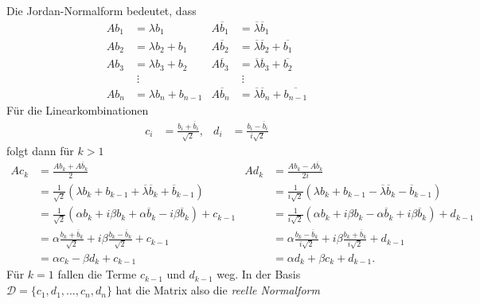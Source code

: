 Die Jordan-Normalform bedeutet, dass
\[
\begin{aligned}
Ab_1&=\lambda b_1           &
	A\overline{b}_1 &= \overline{\lambda} \overline{b}_1      \\
Ab_2&=\lambda b_2 + b_1     &
	A\overline{b}_2 &= \overline{\lambda} \overline{b}_2 +\overline{b_1}\\
Ab_3&=\lambda b_3 + b_2     &
	A\overline{b}_3 &= \overline{\lambda} \overline{b}_3 +\overline{b_2}\\
    &\;\vdots               &
	                 &\;\vdots \\
Ab_n&=\lambda b_n + b_{n-1} &
	A\overline{b}_n &= \overline{\lambda} \overline{b}_n +\overline{b_{n-1}}
\end{aligned}
\]
Für die Linearkombinationen
\begin{equation}
\begin{aligned}
c_i &= \frac{b_i+\overline{b}_i}{\sqrt{2}},
&
d_i &= \frac{b_i-\overline{b}_i}{i\sqrt{2}}
\end{aligned}
\label{buch:eigenwerte:eqn:reellenormalformumrechnung}
\end{equation}
folgt dann für $k>1$
\begin{align*}
Ac_k
&=
\frac{Ab_k+A\overline{b}_k}{2}
&
Ad_k
&=
\frac{Ab_k-A\overline{b}_k}{2i}
\\
&=
\frac1{\sqrt{2}}(\lambda b_k + b_{k-1}
+ \overline{\lambda}\overline{b}_k + \overline{b}_{k-1})
&
&=
\frac1{i\sqrt{2}}(\lambda b_k + b_{k-1}
- \overline{\lambda}\overline{b}_k - \overline{b}_{k-1})
\\
&=
\frac1{\sqrt{2}}(\alpha b_k + i\beta b_k + \alpha \overline{b}_k -i\beta \overline{b}_k)
+
c_{k-1}
&
&=
\frac1{i\sqrt{2}}(
\alpha b_k + i\beta b_k - \alpha \overline{b}_k +i\beta \overline{b}_k)
+
d_{k-1}
\\
&=
\alpha
\frac{b_k+\overline{b}_k}{\sqrt{2}}
+
i \beta \frac{b_k-\overline{b}_k}{\sqrt{2}}
+
c_{k-1}
&
&=
\alpha
\frac{b_k-\overline{b}_k}{i\sqrt{2}}
+
i \beta \frac{b_k+\overline{b}_k}{i\sqrt{2}}
+
d_{k-1}
\\
&= \alpha c_k -\beta d_k
+
c_{k-1}
&
&= \alpha d_k + \beta c_k
+
d_{k-1}.
\end{align*}
Für $k=1$ fallen die Terme $c_{k-1}$ und $d_{k-1}$ weg.
In der Basis $\mathcal{D}=\{c_1,d_1,\dots,c_n,d_n\}$ hat die Matrix
also die {\em reelle Normalform}
